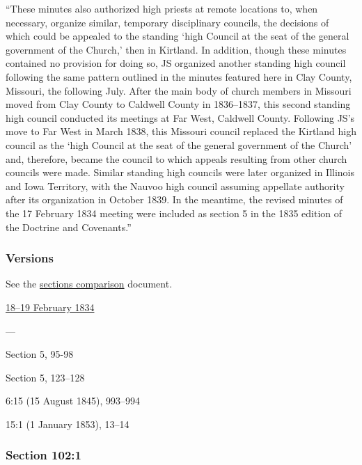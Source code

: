 			``These minutes also authorized high priests at remote locations to, when necessary, organize similar, temporary disciplinary councils, the decisions of which could be appealed to the standing `high Council at the seat of the general government of the Church,' then in Kirtland. In addition, though these minutes contained no provision for doing so, JS organized another standing high council following the same pattern outlined in the minutes featured here in Clay County, Missouri, the following July. After the main body of church members in Missouri moved from Clay County to Caldwell County in 1836--1837, this second standing high council conducted its meetings at Far West, Caldwell County. Following JS's move to Far West in March 1838, this Missouri council replaced the Kirtland high council as the `high Council at the seat of the general government of the Church' and, therefore, became the council to which appeals resulting from other church councils were made. Similar standing high councils were later organized in Illinois and Iowa Territory, with the Nauvoo high council assuming appellate authority after its organization in October 1839. In the meantime, the revised minutes of the 17 February 1834 meeting were included as section 5 in the 1835 edition of the Doctrine and Covenants.''
				
	\subsubsection{Versions}
		\label{DC102-V}
		
		See the \href{https://drive.google.com/file/d/1goAvNz8jS4R8slYfMG_db55Ty2z_vmgK/view?usp=sharing}{sections comparison} document.
	
		\begin{compactdesc}
			\item[JSP] \hyperref[EMS-1834-JS-18-19-FEB-1834]{18--19 February 1834}
			\item[BC] ---
			\item[DC 1835] Section 5, 95-98
			\item[DC 1844] Section 5, 123--128
			\item[TS] 6:15 (15 August 1845), 993--994
			\item[MS] 15:1 (1 January 1853), 13--14
		\end{compactdesc}

	\subsubsection{Section 102:1} %
		\label{DC102-1}

